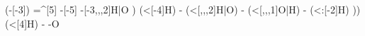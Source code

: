 \begin{struct}
{                                                                                                                                                                    (-[-3])
                                                                                                                                                                =^[5]
                                                                                                                                                                -[-5]
                                                                                                                                                                -[-3,,,2]H|O
                                                                                                                                                            )
                                                                                                                                                                (<[-4]H)
                                                                                                                                                            -
                                                                                                                                                                (<[,,,2]H|O)
                                                                                                                                                            -
                                                                                                                                                                (<[,,,1]O|H)
                                                                                                                                                            -
                                                                                                                                                                (<:[-2]H)
                                                                                                                                                        ))
                                                                                                                                                            (<[4]H)
                                                                                                                                                        -
                                                                                                                                                        -O
}
\end{struct}
